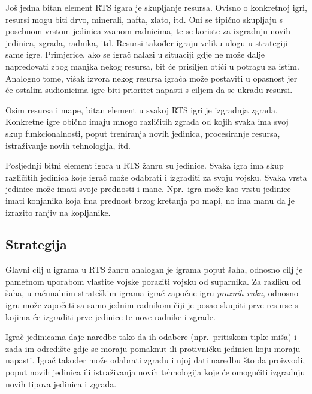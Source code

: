 \documentclass[times, utf8, zavrsni, numeric]{fer}
\begin{document}
\par Još jedna bitan element RTS igara je skupljanje resursa.
Ovisno o konkretnoj igri, resursi mogu biti drvo, minerali, nafta, zlato, itd. Oni se tipično skupljaju s posebnom vrstom jedinica zvanom radnicima, te se koriste za izgradnju novih jedinica, zgrada, radnika, itd.
Resursi također igraju veliku ulogu u strategiji same igre.
Primjerice, ako se igrač nalazi u situaciji gdje ne može dalje napredovati zbog manjka nekog resursa, bit će prisiljen otići u potragu za istim.
Analogno tome, višak izvora nekog resursa igrača može postaviti u opasnost jer će ostalim sudionicima igre biti prioritet napasti s ciljem da se ukradu resursi.

\par Osim resursa i mape, bitan element u svakoj RTS igri je izgradnja zgrada. 
Konkretne igre obično imaju mnogo različitih zgrada od kojih svaka ima svoj skup funkcionalnosti, poput treniranja novih jedinica, procesiranje resursa, istraživanje novih tehnologija, itd.  

\par Posljednji bitni element igara u RTS žanru su jedinice. 
Svaka igra ima skup različitih jedinica koje igrač može odabrati i izgraditi za svoju vojsku.
Svaka vrsta jedinice može imati svoje prednosti i mane.
Npr.\ igra može kao vrstu jedinice imati konjanika koja ima prednost brzog kretanja po mapi, no ima manu da je izrazito ranjiv na kopljanike.

\subsection{Strategija}

\par Glavni cilj u igrama u RTS žanru analogan je igrama poput šaha, odnosno cilj je pametnom uporabom vlastite vojske poraziti vojsku od suparnika. 
Za razliku od šaha, u računalnim strateškim igrama igrač započne igru \textit{praznih ruku}, odnosno igru može započeti sa samo jednim radnikom čiji je posao skupiti prve resurse s kojima će izgraditi prve jedinice te nove radnike i zgrade.

\par Igrač jedinicama daje naredbe tako da ih odabere (npr.\ pritiskom tipke miša) i zada im odredište gdje se moraju pomaknut ili protivničku jedinicu koju moraju napasti. 
Igrač također može odabrati zgradu i njoj dati naredbu što da proizvodi, poput novih jedinica ili istraživanja novih tehnologija koje će omogućiti izgradnju novih tipova jedinica i zgrada.
\end{document}
